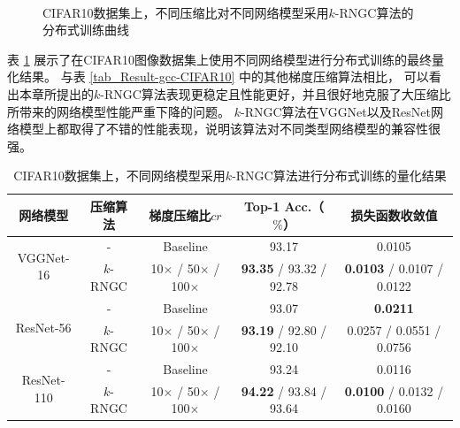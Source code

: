\documentclass{xdupgthesis}
\begin{document}
\begin{figure}[H]
{        \label{fig_Result-k-rngc-resnet110-loss}
    } \\
    \caption{CIFAR10数据集上，不同压缩比对不同网络模型采用$k$-RNGC算法的分布式训练曲线}
    \label{fig_Result-k-rngc-CIFAR10}
\end{figure}

表 \ref*{tab_Result-k-rngc-CIFAR10} 展示了在CIFAR10图像数据集上使用不同网络模型进行分布式训练的最终量化结果。
与表 \ref*{tab_Result-gcc-CIFAR10} 中的其他梯度压缩算法相比，
可以看出本章所提出的$k$-RNGC算法表现更稳定且性能更好，并且很好地克服了大压缩比所带来的网络模型性能严重下降的问题。
$k$-RNGC算法在VGGNet以及ResNet网络模型上都取得了不错的性能表现，说明该算法对不同类型网络模型的兼容性很强。

\renewcommand{\arraystretch}{1.3}
\begin{table}[ht]
    \centering
    \begin{threeparttable}
        \caption{CIFAR10数据集上，不同网络模型采用$k$-RNGC算法进行分布式训练的量化结果}
        \label{tab_Result-k-rngc-CIFAR10}
        \begin{tabular}{c|c|c|c|c}
            \toprule
            \toprule
            网络模型 & 压缩算法 & 梯度压缩比$cr$ & Top-1 Acc.（$\%$） & 损失函数收敛值 \\ 
            \midrule
            \multirow{2}{*}{VGGNet-16} & - & Baseline & 93.17 & 0.0105 \\
                & $k$-RNGC & 10$\times$ / 50$\times$ / 100$\times$ & \textbf{93.35} / 93.32 / 92.78 & \textbf{0.0103} / 0.0107 / 0.0122 \\
            \midrule 
            \multirow{2}{*}{ResNet-56} & - & Baseline & 93.07 & \textbf{0.0211} \\
                & $k$-RNGC & 10$\times$ / 50$\times$ / 100$\times$ & \textbf{93.19} / 92.80 / 92.10 & 0.0257 / 0.0551 / 0.0756 \\
            \midrule
            \multirow{2}{*}{ResNet-110} & - & Baseline & 93.24 & 0.0116 \\
             & $k$-RNGC & 10$\times$ / 50$\times$ / 100$\times$ & \textbf{94.22} / 93.84 / 93.64 & \textbf{0.0100} / 0.0132 / 0.0160 \\
            \bottomrule
            \bottomrule
        \end{tabular}
    \end{threeparttable}
\end{table}
\end{document}
